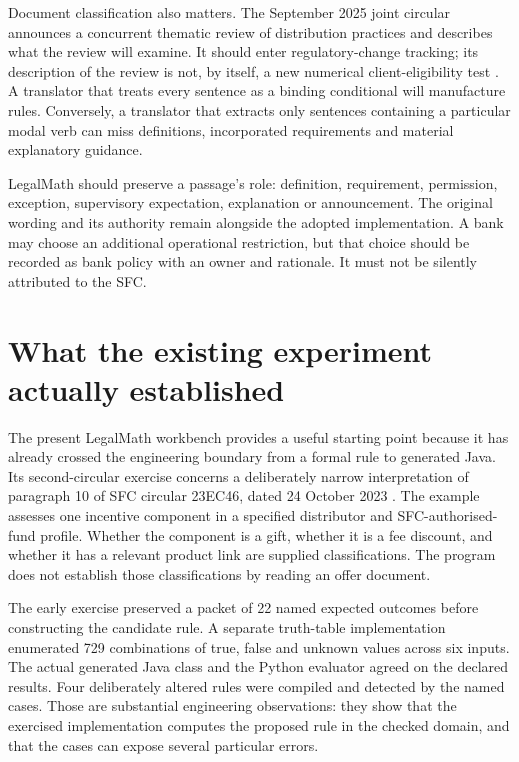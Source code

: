 \documentclass[12pt,a4paper,oneside,openany]{book}
\begin{document}
Document classification also matters. The September 2025 joint circular announces
a concurrent thematic review of distribution practices and describes what the
review will examine. It should enter regulatory-change tracking; its description
of the review is not, by itself, a new numerical client-eligibility test
\citep{sfcreview2025}. A translator that treats every sentence as a binding
conditional will manufacture rules. Conversely, a translator that extracts only
sentences containing a particular modal verb can miss definitions, incorporated
requirements and material explanatory guidance.

LegalMath should preserve a passage's role: definition, requirement, permission,
exception, supervisory expectation, explanation or announcement. The original
wording and its authority remain alongside the adopted implementation. A bank may
choose an additional operational restriction, but that choice should be recorded
as bank policy with an owner and rationale. It must not be silently attributed to
the SFC.

\section{What the existing experiment actually established}
\label{merge:M01:01}

\label{sec:problem-evidence}
The present LegalMath workbench provides a useful starting point because it has
already crossed the engineering boundary from a formal rule to generated Java.
Its second-circular exercise concerns a deliberately narrow interpretation of
paragraph 10 of SFC circular 23EC46, dated 24 October 2023
\citep{sfcmarketing}. The example assesses one incentive component in a specified
distributor and SFC-authorised-fund profile. Whether the component is a gift,
whether it is a fee discount, and whether it has a relevant product link are
supplied classifications. The program does not establish those classifications
by reading an offer document.

The early exercise preserved a packet of 22 named expected outcomes before constructing
the candidate rule. A separate truth-table implementation enumerated 729
combinations of true, false and unknown values across six inputs. The actual
generated Java class and the Python evaluator agreed on the declared results.
Four deliberately altered rules were compiled and detected by the named cases.
Those are substantial engineering observations: they show that the exercised
implementation computes the proposed rule in the checked domain, and that the
cases can expose several particular errors.
\end{document}
